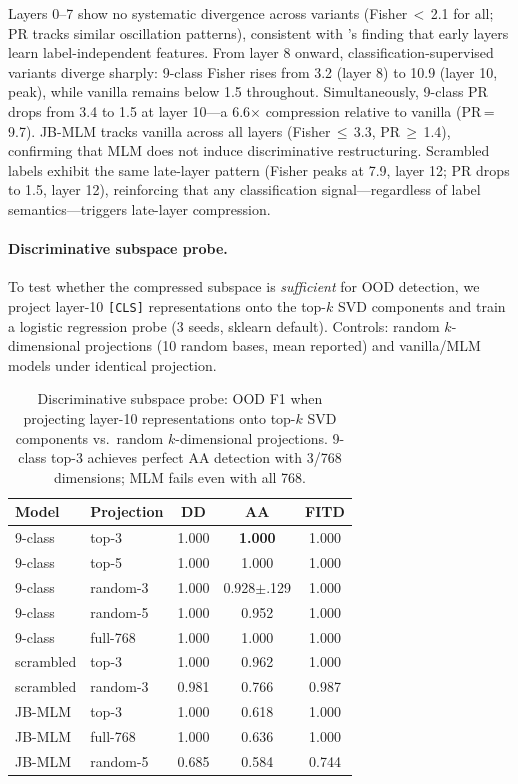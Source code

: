 Layers 0--7 show no systematic divergence across variants (Fisher\,$<$\,2.1 for all; PR tracks similar oscillation patterns), consistent with \citet{maennel2020random}'s finding that early layers learn label-independent features. From layer 8 onward, classification-supervised variants diverge sharply: 9-class Fisher rises from 3.2 (layer 8) to 10.9 (layer 10, peak), while vanilla remains below 1.5 throughout. Simultaneously, 9-class PR drops from 3.4 to 1.5 at layer 10---a 6.6$\times$ compression relative to vanilla (PR\,=\,9.7). JB-MLM tracks vanilla across all layers (Fisher\,$\leq$\,3.3, PR\,$\geq$\,1.4), confirming that MLM does not induce discriminative restructuring. Scrambled labels exhibit the same late-layer pattern (Fisher peaks at 7.9, layer 12; PR drops to 1.5, layer 12), reinforcing that any classification signal---regardless of label semantics---triggers late-layer compression.

\paragraph{Discriminative subspace probe.}
\label{app:discriminative_probe}

To test whether the compressed subspace is \emph{sufficient} for OOD detection, we project layer-10 \texttt{[CLS]} representations onto the top-$k$ SVD components and train a logistic regression probe (3 seeds, sklearn default). Controls: random $k$-dimensional projections (10 random bases, mean reported) and vanilla/MLM models under identical projection.

\begin{table}[ht]
\centering
\footnotesize
\caption{Discriminative subspace probe: OOD F1 when projecting layer-10 representations onto top-$k$ SVD components vs.\ random $k$-dimensional projections. 9-class top-3 achieves perfect AA detection with 3/768 dimensions; MLM fails even with all 768.}
\label{tab:discriminative_probe}
\begin{tabular}{@{}llccc@{}}
\toprule
\textbf{Model} & \textbf{Projection} & DD & AA & FITD \\
\midrule
9-class & top-3 & 1.000 & \textbf{1.000} & 1.000 \\
9-class & top-5 & 1.000 & 1.000 & 1.000 \\
9-class & random-3 & 1.000 & 0.928$\pm$.129 & 1.000 \\
9-class & random-5 & 1.000 & 0.952 & 1.000 \\
9-class & full-768 & 1.000 & 1.000 & 1.000 \\
\midrule
scrambled & top-3 & 1.000 & 0.962 & 1.000 \\
scrambled & random-3 & 0.981 & 0.766 & 0.987 \\
\midrule
JB-MLM & top-3 & 1.000 & 0.618 & 1.000 \\
JB-MLM & full-768 & 1.000 & 0.636 & 1.000 \\
JB-MLM & random-5 & 0.685 & 0.584 & 0.744 \\
\bottomrule
\end{tabular}
\end{table}

